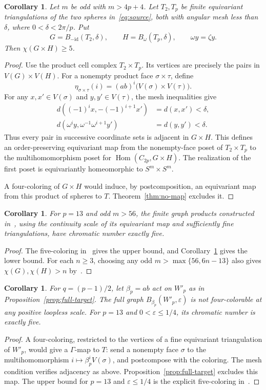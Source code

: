\documentclass[11pt]{amsart}
\newtheorem{corollary}[theorem]{Corollary}
\theoremstyle{remark}
\numberwithin{equation}{section}
\newcommand{\Hom}{\operatorname{Hom}}
\newcommand{\eps}{\varepsilon}
\begin{document}
\begin{corollary}\label{cor:finite}
Let $m$ be odd with $m>4p+4$. Let $T_2,T_p$ be finite equivariant triangulations of the two spheres in~\eqref{eq:source}, both with angular mesh less than $\delta$, where $0<\delta<2\pi/p$. Put
\[
 G=B_{-\mathrm{id}}(T_2,\delta),\qquad
 H=B_\omega(T_p,\delta),\qquad \omega y=\zeta y.
\]
Then $\chi(G\times H)\geq5$.
\end{corollary}
\begin{proof}
Use the product cell complex $T_2\times T_p$. Its vertices are precisely the pairs in $V(G)\times V(H)$. For a nonempty product face $\sigma\times\tau$, define
\[
 \eta_{\sigma\times\tau}(i)
 =(ab)^i\bigl(V(\sigma)\times V(\tau)\bigr).
\]
For any $x,x'\in V(\sigma)$ and $y,y'\in V(\tau)$, the mesh inequalities give
\begin{align*}
 d((-1)^ix,-(-1)^{i+1}x')&=d(x,x')<\delta,\\
 d(\omega^iy,\omega^{-1}\omega^{i+1}y')&=d(y,y')<\delta.
\end{align*}
Thus every pair in successive coordinate sets is adjacent in $G\times H$. This defines an order-preserving equivariant map from the nonempty-face poset of $T_2\times T_p$ to the multihomomorphism poset for $\Hom(C_{2p},G\times H)$. The realization of the first poset is equivariantly homeomorphic to $S^m\times S^m$.

A four-coloring of $G\times H$ would induce, by postcomposition, an equivariant map from this product of spheres to $T$. Theorem~\ref{thm:no-map} excludes it.
\end{proof}

\begin{corollary}
For $p=13$ and odd $m>56$, the finite graph products constructed in~\cite{Companion}, using the continuity scale of its equivariant map and sufficiently fine triangulations, have chromatic number exactly five.
\end{corollary}
\begin{proof}
The five-coloring in~\cite[Theorem~1.1]{Companion} gives the upper bound, and Corollary~\ref{cor:finite} gives the lower bound. For each $n\geq3$, choosing any odd $m>\max\{56,6n-13\}$ also gives $\chi(G),\chi(H)>n$ by~\cite[Lemma~3.2]{Companion}.
\end{proof}

\begin{corollary}
For $q=(p-1)/2$, let $\beta_p=ab$ act on $W'_p$ as in Proposition~\ref{prop:full-target}. The full graph $B_{\beta_p}(W'_p,\eps)$ is not four-colorable at any positive loopless scale. For $p=13$ and $0<\eps\leq1/4$, its chromatic number is exactly five.
\end{corollary}
\begin{proof}
A four-coloring, restricted to the vertices of a fine equivariant triangulation of $W'_p$, would give a $\Gamma$-map to $T$: send a nonempty face $\sigma$ to the multihomomorphism $i\mapsto\beta_p^iV(\sigma)$, and postcompose with the coloring. The mesh condition verifies adjacency as above. Proposition~\ref{prop:full-target} excludes this map. The upper bound for $p=13$ and $\eps\leq1/4$ is the explicit five-coloring in~\cite{Companion}.
\end{proof}
\end{document}
